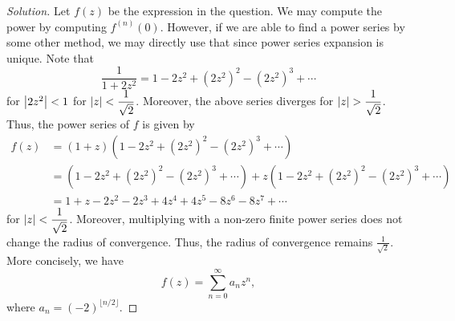 \documentclass[11pt]{article}
\theoremstyle{definition}
\newenvironment{soln}{\begin{proof}[Solution]}{\end{proof}}
\begin{document}
\begin{enumerate}[leftmargin=*]
\begin{soln}
Let $f(z)$ be the expression in the question. We may compute the power by computing $f^{(n)}(0)$. However, if we are able to find a power series by some other method, we may directly use that since power series expansion is unique. Note that
\[
    \frac{1}{1+2z^2} = 1 - 2z^2 + (2z^2)^2 - (2z^2)^3 + \cdots
\]
for $\abs{2z^2} < 1$ for $\abs{z} < \dfrac{1}{\sqrt{2}}$. Moreover, the above series diverges for $\abs{z} > \dfrac{1}{\sqrt{2}}$. Thus, the power series of $f$ is given by
\begin{align*}
    f(z) &= (1+z) \left( 1 - 2z^2 + (2z^2)^2 - (2z^2)^3 + \cdots \right) \\
    &= (1 - 2z^2 + (2z^2)^2 - (2z^2)^3 + \cdots) + z(1 - 2z^2 + (2z^2)^2 - (2z^2)^3 + \cdots) \\
    &= 1+z - 2z^2 - 2z^3 + 4z^4 + 4z^5 - 8z^6 - 8z^7  + \cdots
\end{align*}
for $\abs{z} < \dfrac{1}{\sqrt{2}}$. Moreover, multiplying with a non-zero finite power series does not change the radius of convergence. Thus, the radius of convergence remains $\boxed{\frac{1}{\sqrt{2}}}$. \\
More concisely, we have
\[
    f(z) = \sum_{n=0}^{\infty} a_n z^n,
\]
where $a_n = (-2)^{\lfloor n/2 \rfloor}$.
\end{soln}
\end{enumerate}
\end{document}
